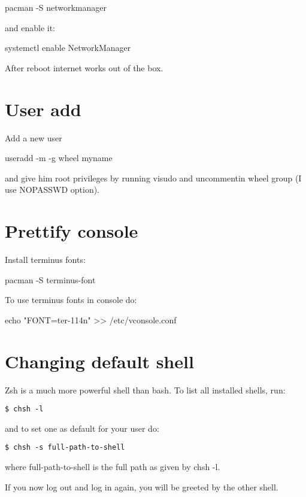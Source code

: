 \documentclass[letterpaper]{article}
\begin{document}
pacman -S networkmanager

and enable it:

systemctl enable NetworkManager

After reboot internet works out of the box. 

\section{User add}
Add a new user 

useradd -m -g wheel myname

and give him root privileges by running 
visudo and uncommentin wheel group (I use NOPASSWD option).




\section{Prettify console}
Install terminus fonts:

pacman -S terminus-font

To use terminus fonts in console do:

echo "FONT=ter-114n" >> /etc/vconsole.conf


\section{Changing default shell}
Zsh is a much more powerful shell than bash. 
To list all installed shells, run:
\begin{lstlisting}
$ chsh -l
\end{lstlisting}
and to set one as default for your user do:
\begin{lstlisting}
$ chsh -s full-path-to-shell
\end{lstlisting}
where full-path-to-shell is the full path as given by chsh -l.

If you now log out and log in again, you will be greeted by the other shell. 
\end{document}
